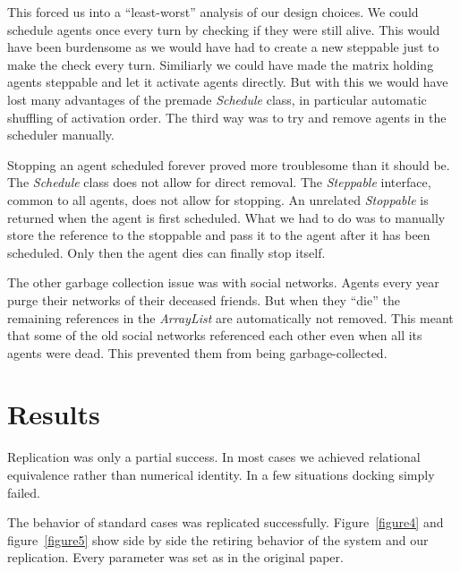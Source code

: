 \documentclass[runningheads,a4paper]{llncs}
\begin{document}
This forced us into a ``least-worst'' analysis of our design choices.
We could schedule agents once every turn by checking if they were still alive.
This would have been burdensome as we would have had to create a new steppable just to make the check every turn.
Similiarly we could have made the matrix holding agents steppable and let it activate agents directly.
But with this we would have lost many advantages of the premade \textit{Schedule} class, in particular automatic shuffling of activation order.
The third way was to try and remove agents in the scheduler manually.

Stopping an agent scheduled forever proved more troublesome than it should be.
The \textit{Schedule} class does not allow for direct removal. 
The \textit{Steppable} interface, common to all agents, does not allow for stopping.
An unrelated \textit{Stoppable} is returned when the agent is first scheduled.
What we had to do was to manually store the reference to the stoppable and pass it to the agent after it has been scheduled.
Only then the agent dies can finally stop itself.

The other garbage collection issue was with social networks.
Agents every year purge their networks of their deceased friends. 
But when they ``die'' the remaining references in the \textit{ArrayList} are automatically not removed.
This meant that some of the old social networks referenced each other even when all its agents were dead.
This prevented them from being garbage-collected.




\section{Results}
Replication was only a partial success. 
In most cases we achieved relational equivalence \cite{springerlink:10.1007/BF01299065} rather than numerical identity.
In a few situations docking simply failed.

The behavior of standard cases was replicated successfully.
Figure~\ref{figure4} and figure~\ref{figure5} show side by side the retiring behavior of the system and our replication.
Every parameter was set as in the original paper.
\end{document}
